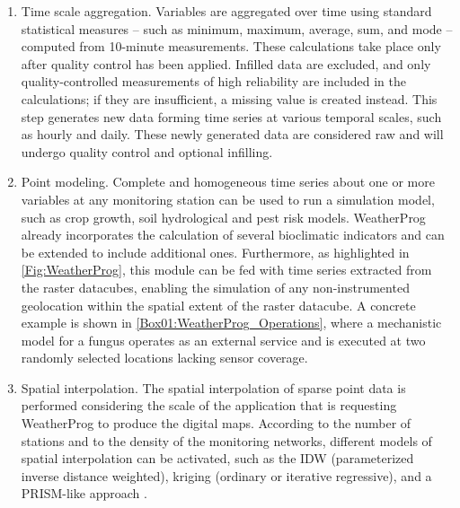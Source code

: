 \documentclass[authoryear,preprint,review,12pt]{elsarticle}
\begin{document}
\begin{enumerate}
    \item Time scale aggregation. Variables are aggregated over time using standard statistical measures -- such as minimum, maximum, average, sum, and mode -- computed from 10-minute measurements. 
    These calculations take place only after quality control has been applied.
    Infilled data are excluded, and only quality-controlled measurements of high reliability are included in the calculations; if they are insufficient, a missing value is created instead.
    This step generates new data forming time series at various temporal scales, such as hourly and daily.
    These newly generated data are considered raw and will undergo quality control and optional infilling.

    \item Point modeling. Complete and homogeneous time series about one or more variables at any monitoring station can be used to run a simulation model, such as crop growth, soil hydrological and pest risk models.
    WeatherProg already incorporates the calculation of several bioclimatic indicators and can be extended to include additional ones.
    Furthermore, as highlighted in \cref{Fig:WeatherProg}, this module can be fed with time series extracted from the raster datacubes, enabling the simulation of any non-instrumented geolocation within the %
    spatial extent of the raster datacube.
    A concrete example is shown in \cref{Box01:WeatherProg_Operations}, where a mechanistic model for a fungus operates as an external service and is executed at two randomly selected locations lacking sensor coverage.
    
    \item Spatial interpolation. The spatial interpolation of sparse point data is performed considering the scale of the application that is requesting WeatherProg to produce the digital maps.
    According to the number of stations and to the density of the monitoring networks, different models of spatial interpolation can be activated, such as the IDW (parameterized inverse distance weighted), kriging (ordinary or iterative regressive), and a PRISM-like approach \citep{Daly08_PRISM_USA}.
    

\end{enumerate}
\end{document}
